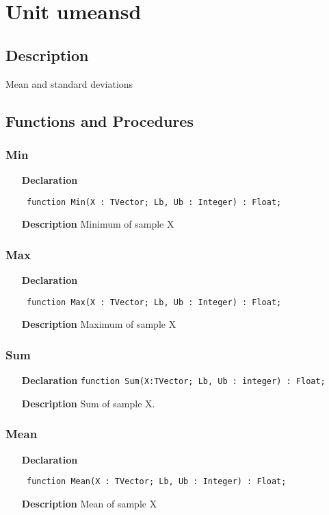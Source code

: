 \documentclass[12pt,a4paper,oneside]{report}
\newcommand{\lmath}[1]{   %
	\marginpar{\vspace{#1} 
		\begin{flushright}
			LMath
	\end{flushright} }
}
\newcommand{\declarationitem}[1]{\textbf{#1}}
\newcommand{\descriptiontitle}[1]{\textbf{#1}}
\newcommand{\code}[1]{\texttt{#1}}
\begin{document}
\section{Unit umeansd}
\label{umeansd}
\subsection{Description}
Mean and standard deviations
\subsection{Functions and Procedures}
\subsubsection{Min}
\label{umeansd-Min}
\begin{itemize}\item[\declarationitem{Declaration}\hfill]
	\begin{flushleft}
		\code{
			function Min(X : TVector; Lb, Ub : Integer) : Float;}
	\end{flushleft}
	\item[\descriptiontitle{Description}]
	Minimum of sample X
\end{itemize}
\subsubsection{Max}
\label{umeansd-Max}
\begin{itemize}\item[\declarationitem{Declaration}\hfill]
	\begin{flushleft}
		\code{
			function Max(X : TVector; Lb, Ub : Integer) : Float;}
	\end{flushleft}
	\item[\descriptiontitle{Description}]
	Maximum of sample X
\end{itemize}
\subsubsection{Sum}\label{umeansd-sum} \lmath{-24pt}
\begin{itemize}
	\item[\declarationitem{Declaration}\hfill]
	\code{function Sum(X:TVector; Lb, Ub : integer) : Float;}
	\item[\descriptiontitle{Description}]
	Sum of sample X.
\end{itemize}
\subsubsection{Mean}
\label{umeansd-Mean}
\begin{itemize}\item[\declarationitem{Declaration}\hfill]
	\begin{flushleft}
		\code{
			function Mean(X : TVector; Lb, Ub : Integer) : Float;}
	\end{flushleft}
	\item[\descriptiontitle{Description}]
	Mean of sample X
\end{itemize}
\end{document}
